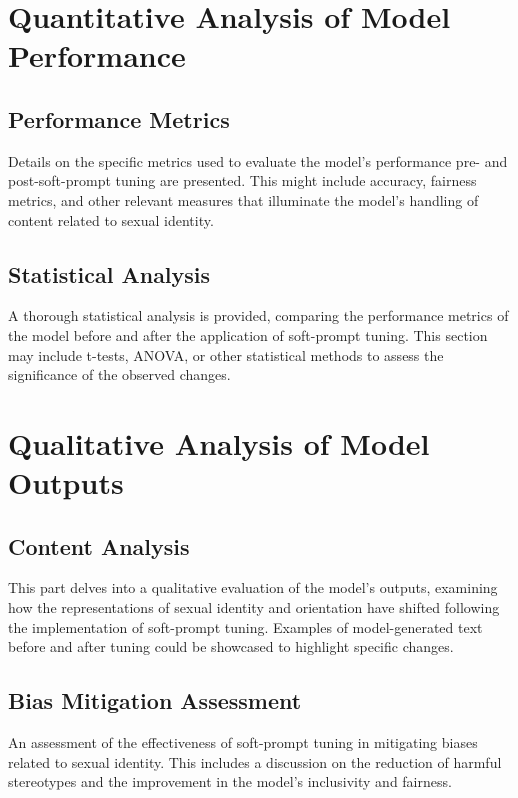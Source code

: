\section{Quantitative Analysis of Model Performance}

\subsection{Performance Metrics}

Details on the specific metrics used to evaluate the model's performance pre- and post-soft-prompt tuning are presented. This might include accuracy, fairness metrics, and other relevant measures that illuminate the model's handling of content related to sexual identity.

\subsection{Statistical Analysis}

A thorough statistical analysis is provided, comparing the performance metrics of the model before and after the application of soft-prompt tuning. This section may include t-tests, ANOVA, or other statistical methods to assess the significance of the observed changes.

\section{Qualitative Analysis of Model Outputs}

\subsection{Content Analysis}

This part delves into a qualitative evaluation of the model's outputs, examining how the representations of sexual identity and orientation have shifted following the implementation of soft-prompt tuning. Examples of model-generated text before and after tuning could be showcased to highlight specific changes.

\subsection{Bias Mitigation Assessment}

An assessment of the effectiveness of soft-prompt tuning in mitigating biases related to sexual identity. This includes a discussion on the reduction of harmful stereotypes and the improvement in the model's inclusivity and fairness.

